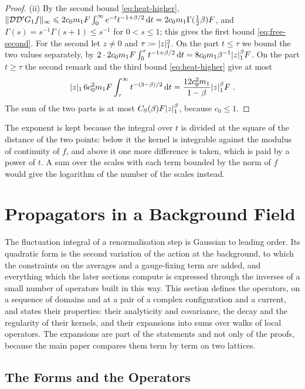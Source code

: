 \documentclass[11pt]{preprint}
\newcommand{\dd}{\mathrm{d}}
\DeclarePairedDelimiter{\abs}{\lvert}{\rvert}
\DeclarePairedDelimiter{\norm}{\lVert}{\rVert}
\numberwithin{equation}{section}
\begin{document}
\begin{proof}
(ii) By the second bound \eqref{eq:heat-higher}, $\norm{\mathcal D\mathcal D'G_1f}_\infty \leqslant 2c_0m_1F\int_0^\infty e^{-t}t^{-1+\beta/2}\,\dd t = 2c_0m_1\Gamma(\frac{1}{2}\beta)F$, and $\Gamma(s) = s^{-1}\Gamma(s + 1) \leqslant s^{-1}$ for $0 < s \leqslant 1$; this gives the first bound \eqref{eq:free-second}. For the second let $z \neq 0$ and $\tau \coloneqq \abs z_1^2$. On the part $t \leqslant \tau$ we bound the two values separately, by $2 \cdot 2c_0m_1F\int_0^\tau t^{-1+\beta/2}\,\dd t = 8c_0m_1\beta^{-1}\abs z_1^\beta F$. On the part $t \geqslant \tau$ the second remark and the third bound \eqref{eq:heat-higher} give at most
\[
    \abs z_1\,6c_0^2m_1F\int_\tau^\infty t^{-(3-\beta)/2}\,\dd t = \frac{12c_0^2m_1}{1 - \beta}\abs z_1^\beta F\;.
\]
The sum of the two parts is at most $C_{\mathrm S}(\beta)F\abs z_1^\beta$, because $c_0 \leqslant 1$.
\end{proof}

The exponent is kept because the integral over $t$ is divided at the square of the distance of the two points: below it the kernel is integrable against the modulus of continuity of $f$, and above it one more difference is taken, which is paid by a power of $t$. A sum over the scales with each term bounded by the norm of $f$ would give the logarithm of the number of the scales instead.

\section{Propagators in a Background Field}\label{sec:propagators}

The fluctuation integral of a renormalisation step is Gaussian to leading order. Its quadratic form is the second variation of the action at the background, to which the constraints on the averages and a gauge-fixing term are added, and everything which the later sections compute is expressed through the inverses of a small number of operators built in this way. This section defines the operators, on a sequence of domains and at a pair of a complex configuration and a current, and states their properties: their analyticity and covariance, the decay and the regularity of their kernels, and their expansions into sums over walks of local operators. The expansions are part of the statements and not only of the proofs, because the main paper compares them term by term on two lattices.

\subsection{The Forms and the Operators}\label{sec:forms}
\end{document}
